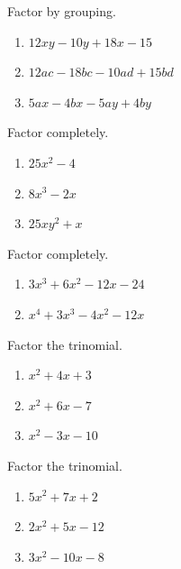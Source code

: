 \documentclass[en,11pt]{elegantbook}
\let\BeginKnitrBlock\begin \let\EndKnitrBlock\end
\begin{document}
\BeginKnitrBlock{exercise}
\protect\hypertarget{exr:unnamed-chunk-25}{}{\label{exr:unnamed-chunk-25} }
Factor by grouping.

\begin{enumerate}
\def\labelenumi{\arabic{enumi}.}

\item
  \(12xy-10y+18x-15\)
\item
  \(12ac-18bc-10ad+15bd\)
\item
  \(5ax-4bx-5ay+4by\)
\end{enumerate}
\EndKnitrBlock{exercise}

\BeginKnitrBlock{exercise}
\protect\hypertarget{exr:unnamed-chunk-26}{}{\label{exr:unnamed-chunk-26} }
Factor completely.

\begin{enumerate}
\def\labelenumi{\arabic{enumi}.}

\item
  \(25x^2-4\)
\item
  \(8x^3-2x\)
\item
  \(25xy^2+x\)
\end{enumerate}
\EndKnitrBlock{exercise}

\BeginKnitrBlock{exercise}
\protect\hypertarget{exr:unnamed-chunk-27}{}{\label{exr:unnamed-chunk-27} }
Factor completely.

\begin{enumerate}
\def\labelenumi{\arabic{enumi}.}

\item
  \(3x^3+6x^2-12x-24\)
\item
  \(x^4+3x^3-4x^2-12x\)
\end{enumerate}
\EndKnitrBlock{exercise}

\BeginKnitrBlock{exercise}
\protect\hypertarget{exr:unnamed-chunk-28}{}{\label{exr:unnamed-chunk-28} }
Factor the trinomial.

\begin{enumerate}
\def\labelenumi{\arabic{enumi}.}

\item
  \(x^2+4x+3\)
\item
  \(x^2+6x-7\)
\item
  \(x^2-3x-10\)
\end{enumerate}
\EndKnitrBlock{exercise}

\BeginKnitrBlock{exercise}
\protect\hypertarget{exr:unnamed-chunk-29}{}{\label{exr:unnamed-chunk-29} }
Factor the trinomial.

\begin{enumerate}
\def\labelenumi{\arabic{enumi}.}

\item
  \(5x^2+7x+2\)
\item
  \(2x^2+5x-12\)
\item
  \(3x^2-10x-8\)
\end{enumerate}
\EndKnitrBlock{exercise}
\end{document}

